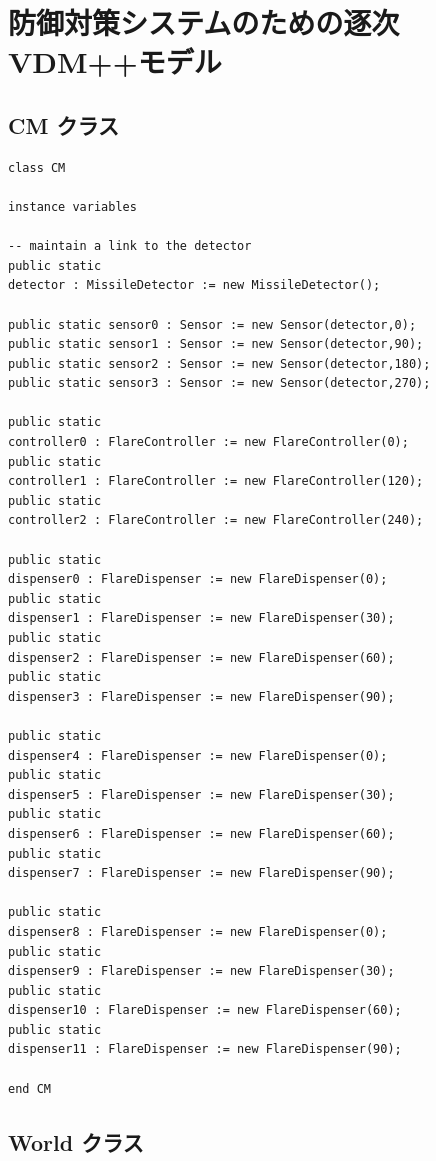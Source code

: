 \documentclass[\pformat,12pt]{jreport}
\begin{document}
\section{防御対策システムのための逐次VDM++モデル}

\subsection{CM クラス}

\begin{lstlisting}
class CM

instance variables

-- maintain a link to the detector
public static 
detector : MissileDetector := new MissileDetector();

public static sensor0 : Sensor := new Sensor(detector,0);
public static sensor1 : Sensor := new Sensor(detector,90);
public static sensor2 : Sensor := new Sensor(detector,180);
public static sensor3 : Sensor := new Sensor(detector,270);

public static 
controller0 : FlareController := new FlareController(0);
public static 
controller1 : FlareController := new FlareController(120);
public static 
controller2 : FlareController := new FlareController(240);

public static 
dispenser0 : FlareDispenser := new FlareDispenser(0);
public static 
dispenser1 : FlareDispenser := new FlareDispenser(30);
public static 
dispenser2 : FlareDispenser := new FlareDispenser(60);
public static 
dispenser3 : FlareDispenser := new FlareDispenser(90);

public static 
dispenser4 : FlareDispenser := new FlareDispenser(0);
public static 
dispenser5 : FlareDispenser := new FlareDispenser(30);
public static 
dispenser6 : FlareDispenser := new FlareDispenser(60);
public static 
dispenser7 : FlareDispenser := new FlareDispenser(90);

public static 
dispenser8 : FlareDispenser := new FlareDispenser(0);
public static 
dispenser9 : FlareDispenser := new FlareDispenser(30);
public static 
dispenser10 : FlareDispenser := new FlareDispenser(60);
public static 
dispenser11 : FlareDispenser := new FlareDispenser(90);

end CM
\end{lstlisting}

\subsection{World クラス}
\end{document}
